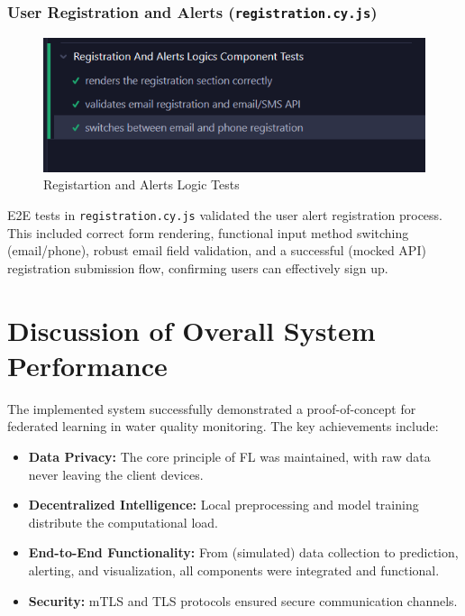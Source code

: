 \subsubsection{User Registration and Alerts (\texttt{registration.cy.js})}
\begin{figure}[H]
    \centering
    \includegraphics[width=0.75\linewidth]{Figures/test4.png}
    \caption{Registartion and Alerts Logic Tests}
    \label{fig:enter-label}
\end{figure}
\label{sssec:registration_test_summary_summary}
E2E tests in \texttt{registration.cy.js} validated the user alert registration process. This included correct form rendering, functional input method switching (email/phone), robust email field validation, and a successful (mocked API) registration submission flow, confirming users can effectively sign up.


\section{Discussion of Overall System Performance}
\label{sec:overall_performance_discussion}
The implemented system successfully demonstrated a proof-of-concept for federated learning in water quality monitoring. The key achievements include:
\begin{itemize}
    \item \textbf{Data Privacy:} The core principle of FL was maintained, with raw data never leaving the client devices.
    \item \textbf{Decentralized Intelligence:} Local preprocessing and model training distribute the computational load.
    \item \textbf{End-to-End Functionality:} From (simulated) data collection to prediction, alerting, and visualization, all components were integrated and functional.
    \item \textbf{Security:} mTLS and TLS protocols ensured secure communication channels.
\end{itemize}

